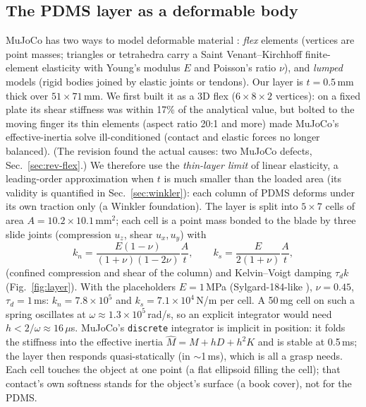 \documentclass[10pt,twocolumn]{article}
\newcommand{\code}[1]{\texttt{\small #1}}
\begin{document}
\subsection{The PDMS layer as a deformable body}\label{sec:pdms}
MuJoCo has two ways to model deformable material \cite{mujocodocs}: \emph{flex} elements (vertices are point
masses; triangles or tetrahedra carry a Saint Venant--Kirchhoff finite-element elasticity with Young's modulus
$E$ and Poisson's ratio $\nu$), and \emph{lumped} models (rigid bodies joined by elastic joints or tendons). Our
layer is $t=0.5$\,mm thick over $51\times71$\,mm. We first built it as a 3D flex ($6\times8\times2$ vertices): on a
fixed plate its shear stiffness was within 17\% of the analytical value, but bolted to the moving finger its thin
elements (aspect ratio 20:1 and more) made MuJoCo's effective-inertia solve ill-conditioned (contact and elastic
forces no longer balanced). (The revision found the actual causes: two MuJoCo defects, Sec.~\ref{sec:rev-flex}.) We therefore use the \emph{thin-layer limit} of linear elasticity, a leading-order approximation when $t$ is much
smaller than the loaded area \cite{johnson1985} (its validity is quantified in Sec.~\ref{sec:winkler}): each column of PDMS deforms under its own traction only
(a Winkler foundation). The layer is split into $5\times7$ cells of area $A=10.2\times10.1$\,mm$^2$; each cell is a
point mass bonded to the blade by three slide joints (compression $u_z$, shear $u_x,u_y$) with
\begin{equation}
k_n=\frac{E(1-\nu)}{(1+\nu)(1-2\nu)}\frac{A}{t},\qquad k_s=\frac{E}{2(1+\nu)}\frac{A}{t},
\label{eq:k}
\end{equation}
(confined compression and shear of the column) and Kelvin--Voigt damping $\tau_d k$
(Fig.~\ref{fig:layer}). With the placeholders $E=1$\,MPa (Sylgard-184-like \cite{johnston2014}), $\nu=0.45$,
$\tau_d=1$\,ms: $k_n=7.8\times10^5$ and $k_s=7.1\times10^4$\,N/m per cell. A 50\,mg cell on such a spring
oscillates at $\omega\approx1.3\times10^5$\,rad/s, so an explicit integrator would need $h<2/\omega\approx16\,\mu$s.
MuJoCo's \code{discrete} integrator is implicit in position: it folds the stiffness into the effective inertia
$\hat M=M+hD+h^2K$ and is stable at 0.5\,ms; the layer then responds quasi-statically (in $\sim$1\,ms), which is all
a grasp needs. Each cell touches the object at one point (a flat ellipsoid filling the cell); that contact's own
softness stands for the object's surface (a book cover), not for the PDMS.
\end{document}
